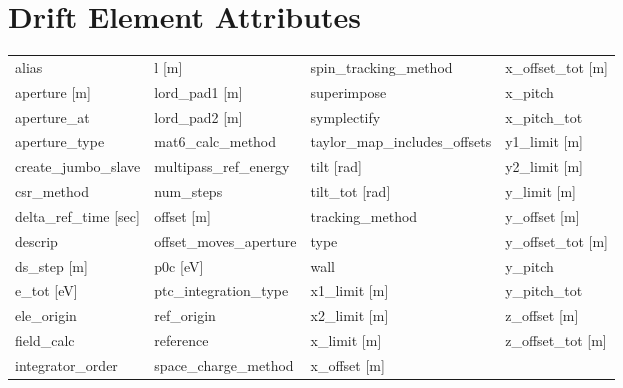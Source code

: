  \section{Drift Element Attributes}
 \label{s:list.drift}
 
 \begin{tabular}{llll} \toprule
alias                          & l [m]                          & spin_tracking_method           & x_offset_tot [m]               \\
aperture [m]                   & lord_pad1 [m]                  & superimpose                    & x_pitch                        \\
aperture_at                    & lord_pad2 [m]                  & symplectify                    & x_pitch_tot                    \\
aperture_type                  & mat6_calc_method               & taylor_map_includes_offsets    & y1_limit [m]                   \\
create_jumbo_slave             & multipass_ref_energy           & tilt [rad]                     & y2_limit [m]                   \\
csr_method                     & num_steps                      & tilt_tot [rad]                 & y_limit [m]                    \\
delta_ref_time [sec]           & offset [m]                     & tracking_method                & y_offset [m]                   \\
descrip                        & offset_moves_aperture          & type                           & y_offset_tot [m]               \\
ds_step [m]                    & p0c [eV]                       & wall                           & y_pitch                        \\
e_tot [eV]                     & ptc_integration_type           & x1_limit [m]                   & y_pitch_tot                    \\
ele_origin                     & ref_origin                     & x2_limit [m]                   & z_offset [m]                   \\
field_calc                     & reference                      & x_limit [m]                    & z_offset_tot [m]               \\
integrator_order               & space_charge_method            & x_offset [m]                   &                                \\
 \bottomrule
 \end{tabular}
 \vfill
 
